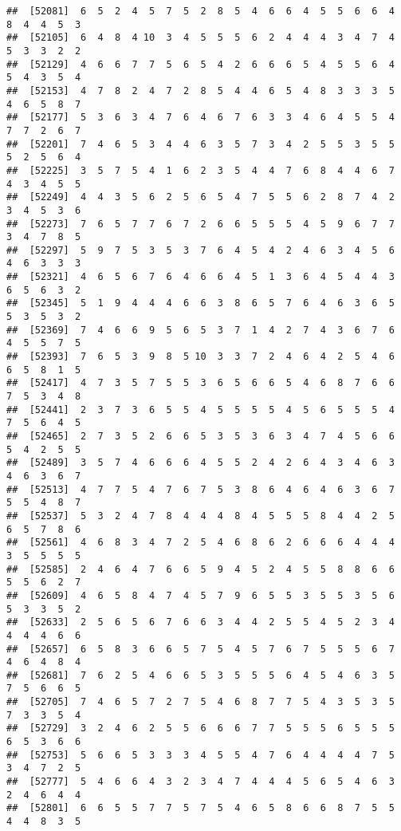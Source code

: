 \documentclass[
]{book}
\begin{document}
\begin{verbatim}
##  [52081]  6  5  2  4  5  7  5  2  8  5  4  6  6  4  5  5  6  6  4  8  4  4  5  3
##  [52105]  6  4  8  4 10  3  4  5  5  5  6  2  4  4  4  3  4  7  4  5  3  3  2  2
##  [52129]  4  6  6  7  7  5  6  5  4  2  6  6  6  5  4  5  5  6  4  5  4  3  5  4
##  [52153]  4  7  8  2  4  7  2  8  5  4  4  6  5  4  8  3  3  3  5  4  6  5  8  7
##  [52177]  5  3  6  3  4  7  6  4  6  7  6  3  3  4  6  4  5  5  4  7  7  2  6  7
##  [52201]  7  4  6  5  3  4  4  6  3  5  7  3  4  2  5  5  3  5  5  5  2  5  6  4
##  [52225]  3  5  7  5  4  1  6  2  3  5  4  4  7  6  8  4  4  6  7  4  3  4  5  5
##  [52249]  4  4  3  5  6  2  5  6  5  4  7  5  5  6  2  8  7  4  2  3  4  5  3  6
##  [52273]  7  6  5  7  7  6  7  2  6  6  5  5  5  4  5  9  6  7  7  3  4  7  8  5
##  [52297]  5  9  7  5  3  5  3  7  6  4  5  4  2  4  6  3  4  5  6  4  6  3  3  3
##  [52321]  4  6  5  6  7  6  4  6  6  4  5  1  3  6  4  5  4  4  3  6  5  6  3  2
##  [52345]  5  1  9  4  4  4  6  6  3  8  6  5  7  6  4  6  3  6  5  5  3  5  3  2
##  [52369]  7  4  6  6  9  5  6  5  3  7  1  4  2  7  4  3  6  7  6  4  5  5  7  5
##  [52393]  7  6  5  3  9  8  5 10  3  3  7  2  4  6  4  2  5  4  6  6  5  8  1  5
##  [52417]  4  7  3  5  7  5  5  3  6  5  6  6  5  4  6  8  7  6  6  7  5  3  4  8
##  [52441]  2  3  7  3  6  5  5  4  5  5  5  5  4  5  6  5  5  5  4  7  5  6  4  5
##  [52465]  2  7  3  5  2  6  6  5  3  5  3  6  3  4  7  4  5  6  6  5  4  2  5  5
##  [52489]  3  5  7  4  6  6  6  4  5  5  2  4  2  6  4  3  4  6  3  4  6  3  6  7
##  [52513]  4  7  7  5  4  7  6  7  5  3  8  6  4  6  4  6  3  6  7  5  5  4  8  7
##  [52537]  5  3  2  4  7  8  4  4  4  8  4  5  5  5  8  4  4  2  5  6  5  7  8  6
##  [52561]  4  6  8  3  4  7  2  5  4  6  8  6  2  6  6  6  4  4  4  3  5  5  5  5
##  [52585]  2  4  6  4  7  6  6  5  9  4  5  2  4  5  5  8  8  6  6  5  5  6  2  7
##  [52609]  4  6  5  8  4  7  4  5  7  9  6  5  5  3  5  5  3  5  6  5  3  3  5  2
##  [52633]  2  5  6  5  6  7  6  6  3  4  4  2  5  5  4  5  2  3  4  4  4  4  6  6
##  [52657]  6  5  8  3  6  6  5  7  5  4  5  7  6  7  5  5  5  6  7  4  6  4  8  4
##  [52681]  7  6  2  5  4  6  6  5  3  5  5  5  6  4  5  4  6  3  5  7  5  6  6  5
##  [52705]  7  4  6  5  7  2  7  5  4  6  8  7  7  5  4  3  5  3  5  7  3  3  5  4
##  [52729]  3  2  4  6  2  5  5  6  6  6  7  7  5  5  5  6  5  5  5  6  5  3  6  6
##  [52753]  5  6  6  5  3  3  3  4  5  5  4  7  6  4  4  4  4  7  5  3  4  7  2  5
##  [52777]  5  4  6  6  4  3  2  3  4  7  4  4  4  5  6  5  4  6  3  2  4  6  4  4
##  [52801]  6  6  5  5  7  7  5  7  5  4  6  5  8  6  6  8  7  5  5  4  4  8  3  5

\end{verbatim}
\end{document}
